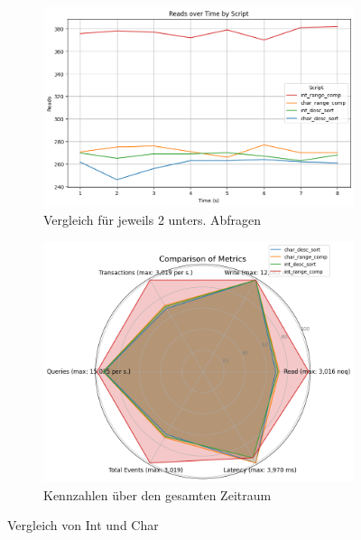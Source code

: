 \vspace{-15pt}
\begin{figure}[H]
    \centering
    \begin{subfigure}[t]{0.48\textwidth}
        \centering
        \includegraphics[width=\textwidth]{PNGs/Script/Data_Types/Simpler/int-char/Reads}
        \caption{Vergleich für jeweils 2 unters. Abfragen}
        \label{data-types-simpler-reads}
    \end{subfigure}
    \hfill
    \begin{subfigure}[t]{0.48\textwidth}
        \centering
        \includegraphics[width=\textwidth]{PNGs/Script/Data_Types/Simpler/int-char/statistics}
        \caption{Kennzahlen über den gesamten Zeitraum}
        \label{fig:data-types-simpler-statistics}
    \end{subfigure}
    \caption[Datentypen: Int und Char]{Vergleich von Int und Char}
\end{figure}
\vspace{-20pt}

